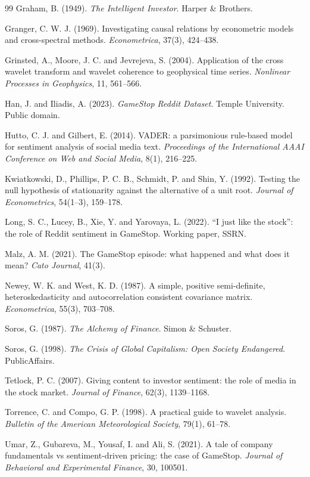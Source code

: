 \documentclass[11pt,a4paper]{article}
\begin{document}
\begin{thebibliography}{99}
Graham, B. (1949). \emph{The Intelligent Investor}. Harper \& Brothers.

Granger, C. W. J. (1969). Investigating causal relations by econometric models
and cross-spectral methods. \emph{Econometrica}, 37(3), 424--438.

Grinsted, A., Moore, J. C. and Jevrejeva, S. (2004). Application of the cross
wavelet transform and wavelet coherence to geophysical time series.
\emph{Nonlinear Processes in Geophysics}, 11, 561--566.

Han, J. and Iliadis, A. (2023). \emph{GameStop Reddit Dataset}. Temple
University. Public domain.

Hutto, C. J. and Gilbert, E. (2014). VADER: a parsimonious rule-based model for
sentiment analysis of social media text. \emph{Proceedings of the International
AAAI Conference on Web and Social Media}, 8(1), 216--225.

Kwiatkowski, D., Phillips, P. C. B., Schmidt, P. and Shin, Y. (1992). Testing
the null hypothesis of stationarity against the alternative of a unit root.
\emph{Journal of Econometrics}, 54(1--3), 159--178.

Long, S. C., Lucey, B., Xie, Y. and Yarovaya, L. (2022). ``I just like the
stock'': the role of Reddit sentiment in GameStop. Working paper, SSRN.

Malz, A. M. (2021). The GameStop episode: what happened and what does it mean?
\emph{Cato Journal}, 41(3).

Newey, W. K. and West, K. D. (1987). A simple, positive semi-definite,
heteroskedasticity and autocorrelation consistent covariance matrix.
\emph{Econometrica}, 55(3), 703--708.

Soros, G. (1987). \emph{The Alchemy of Finance}. Simon \& Schuster.

Soros, G. (1998). \emph{The Crisis of Global Capitalism: Open Society
Endangered}. PublicAffairs.

Tetlock, P. C. (2007). Giving content to investor sentiment: the role of media in
the stock market. \emph{Journal of Finance}, 62(3), 1139--1168.

Torrence, C. and Compo, G. P. (1998). A practical guide to wavelet analysis.
\emph{Bulletin of the American Meteorological Society}, 79(1), 61--78.

Umar, Z., Gubareva, M., Yousaf, I. and Ali, S. (2021). A tale of company
fundamentals vs sentiment-driven pricing: the case of GameStop. \emph{Journal of
Behavioral and Experimental Finance}, 30, 100501.

\end{thebibliography}
\end{document}
